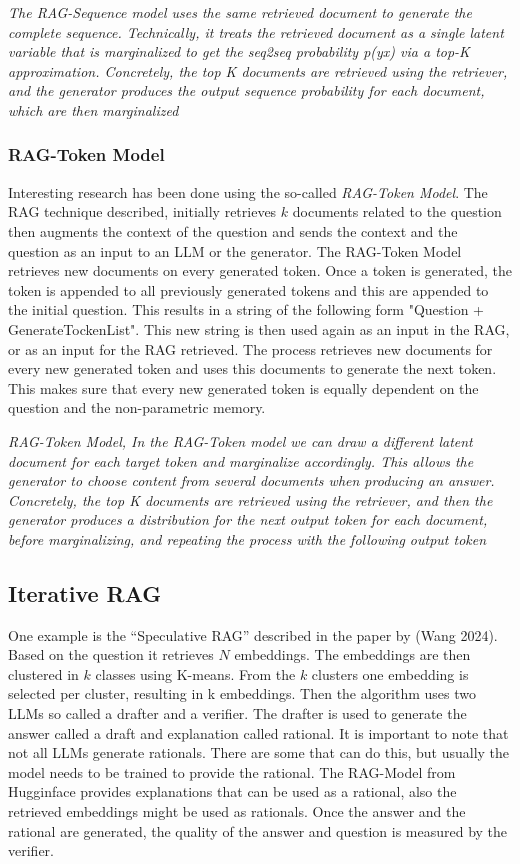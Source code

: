 \documentclass{wseas}
\begin{document}
\emph{The RAG-Sequence model uses the same retrieved document to
generate the complete sequence. Technically, it treats the retrieved
document as a single latent variable that is marginalized to get the
seq2seq probability p(y\textbar x) via a top-K approximation.
Concretely, the top K documents are retrieved using the retriever, and
the generator produces the output sequence probability for each
document, which are then marginalized} \cite{cite3}

\subsubsection{RAG-Token Model}

Interesting research has been done using the so-called \emph{RAG-Token
Model}. The RAG technique described, initially retrieves \(k\) documents
related to the question then augments the context of the question and
sends the context and the question as an input to an LLM or the
generator. The RAG-Token Model retrieves new documents on every
generated token. Once a token is generated, the token is appended to all
previously generated tokens and this are appended to the initial
question. This results in a string of the following form "Question +
GenerateTockenList". This new string is then used again as an input in
the RAG, or as an input for the RAG retrieved. The process retrieves new
documents for every new generated token and uses this documents to
generate the next token. This makes sure that every new generated token
is equally dependent on the question and the non-parametric memory.

\emph{RAG-Token Model, In the RAG-Token model we can draw a different
latent document for each target token and marginalize accordingly. This
allows the generator to choose content from several documents when
producing an answer. Concretely, the top K documents are retrieved using
the retriever, and then the generator produces a distribution for the
next output token for each document, before marginalizing, and repeating
the process with the following output token}
\cite{cite3}

\subsection{Iterative RAG}

One example is the ``Speculative RAG'' described in the paper \cite{cite18}
by (Wang 2024). Based on the question it retrieves \(N\) embeddings. The
embeddings are then clustered in \(k\) classes using K-means. From the
\(k\) clusters one embedding is selected per cluster, resulting in k
embeddings. Then the algorithm uses two LLMs so called a drafter and a
verifier. The drafter is used to generate the answer called a draft and
explanation called rational. It is important to note that not all LLMs
generate rationals. There are some that can do this, but usually the
model needs to be trained to provide the rational. The RAG-Model from
Hugginface provides explanations that can be used as a rational, also
the retrieved embeddings might be used as rationals. Once the answer and
the rational are generated, the quality of the answer and question is
measured by the verifier.
\end{document}
